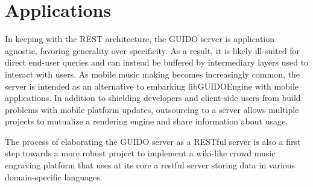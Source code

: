 \documentclass[a4paper]{article}
\begin{document}
\section{Applications}
In keeping with the REST architecture, the GUIDO server is application agnostic, favoring generality over specificity.  As a result, it is likely ill-suited for direct end-user queries and can instead be buffered by intermediary layers used to interact with users.  As mobile music making becomes increasingly common, the server is intended as an alternative to embarking libGUIDOEngine with mobile applications.  In addition to shielding developers and client-side users from build problems with mobile platform updates, outsourcing to a server allows multiple projects to mutualize a rendering engine and share information about usage.\par
The process of elaborating the GUIDO server as a RESTful server is also a first step towards a more robust project to implement a wiki-like crowd music engraving platform that uses at its core a restful server storing data in various domain-specific languages.



\end{document}
